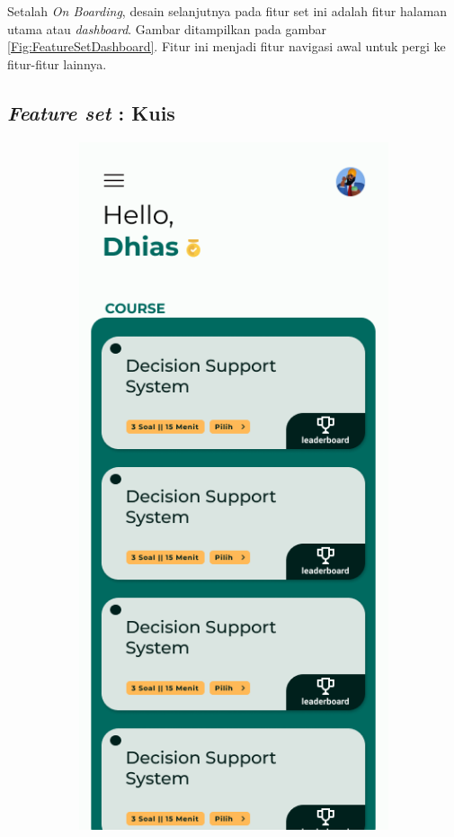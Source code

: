 Setalah \textit{On Boarding}, desain selanjutnya pada fitur set ini adalah fitur halaman utama atau \textit{dashboard}. Gambar ditampilkan pada gambar \ref*{Fig:FeatureSetDashboard}.
Fitur ini menjadi fitur navigasi awal untuk pergi ke fitur-fitur lainnya.
\subsection{\textit{Feature set} : Kuis}
\begin{figure}[H]
	\centering
	\begin{subfigure}[b]{0.23\textwidth}
		\centering
	  \includegraphics[width=\linewidth]{contents/chapter-3/images/HF-QuizList.png}

\end{subfigure}
\end{figure}
